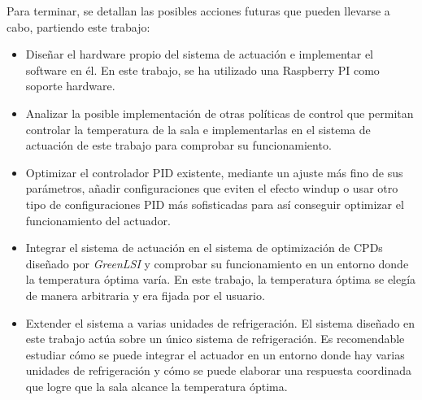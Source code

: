 	Para terminar, se detallan las posibles acciones futuras que pueden llevarse a cabo, partiendo este trabajo:

\begin{itemize}

\item Diseñar el hardware propio del sistema de actuación e implementar el software en él. En este trabajo, se ha utilizado una Raspberry PI como soporte hardware. 

\item Analizar la posible implementación de otras políticas de control que permitan controlar la temperatura de la sala e implementarlas en el sistema de actuación de este trabajo para comprobar su funcionamiento. 

\item Optimizar el controlador PID existente, mediante un ajuste más fino de sus parámetros, añadir configuraciones que eviten el efecto windup o usar otro tipo de configuraciones PID más sofisticadas para así conseguir optimizar el funcionamiento del actuador.

\item Integrar el sistema de actuación en el sistema de optimización de CPDs diseñado por \textit{GreenLSI} y comprobar su funcionamiento en un entorno donde la temperatura óptima varía. En este trabajo, la temperatura óptima se elegía de manera arbitraria y era fijada por el usuario.

\item Extender el sistema a varias unidades de refrigeración. El sistema diseñado en este trabajo actúa sobre un único sistema de refrigeración. Es recomendable estudiar cómo se puede integrar el actuador en un entorno donde hay varias unidades de refrigeración y cómo se puede elaborar una respuesta coordinada que logre que la sala alcance la temperatura óptima.

\end{itemize}

